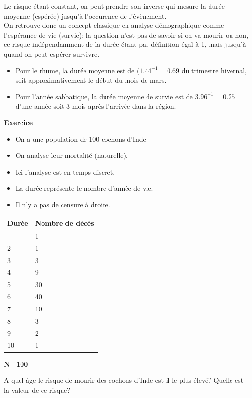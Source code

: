 \documentclass[
  12pt,
  letterpaper,
  DIV=11,
  numbers=noendperiod,
  onepage,
  openany]{scrreprt}
\providecommand{\tightlist}{%
  \setlength{\itemsep}{0pt}\setlength{\parskip}{0pt}}\usepackage{longtable,booktabs,array}
\begin{document}
Le risque étant constant, on peut prendre son inverse qui mesure la
durée moyenne (espérée) jusqu'à l'occurence de l'évènement.\\
On retrouve donc un concept classique en analyse démographique comme
l'espérance de vie (survie): la question n'est pas de savoir si on va
mourir ou non, ce risque indépendamment de la durée étant par définition
égal à 1, mais jusqu'à quand on peut espérer survivre.

\begin{itemize}
\tightlist
\item
  Pour le rhume, la durée moyenne est de \((1.44^{-1}=0.69\) du
  trimestre hivernal, soit approximativement le début du mois de mars.
\item
  Pour l'année sabbatique, la durée moyenne de survie est de
  \(3.96^{-1}=0.25\) d'une année soit 3 mois après l'arrivée dans la
  région.
\end{itemize}

\textbf{Exercice}

\begin{itemize}
\tightlist
\item
  On a une population de 100 cochons d'Inde.
\item
  On analyse leur mortalité (naturelle).\\
\item
  Ici l'analyse est en temps discret.
\item
  La durée représente le nombre d'année de vie.
\item
  Il n'y a pas de censure à droite.
\end{itemize}

\begin{longtable}[]{@{}ll@{}}
\toprule\noalign{}
Durée & Nombre de décès \\
\midrule\noalign{}
\endhead
\bottomrule\noalign{}
\endlastfoot
1 & 1 \\
2 & 1 \\
3 & 3 \\
4 & 9 \\
5 & 30 \\
6 & 40 \\
7 & 10 \\
8 & 3 \\
9 & 2 \\
10 & 1 \\
\end{longtable}

\textbf{N=100}

A quel âge le risque de mourir des cochons d'Inde est-il le plus élevé?
Quelle est la valeur de ce risque?
\end{document}
